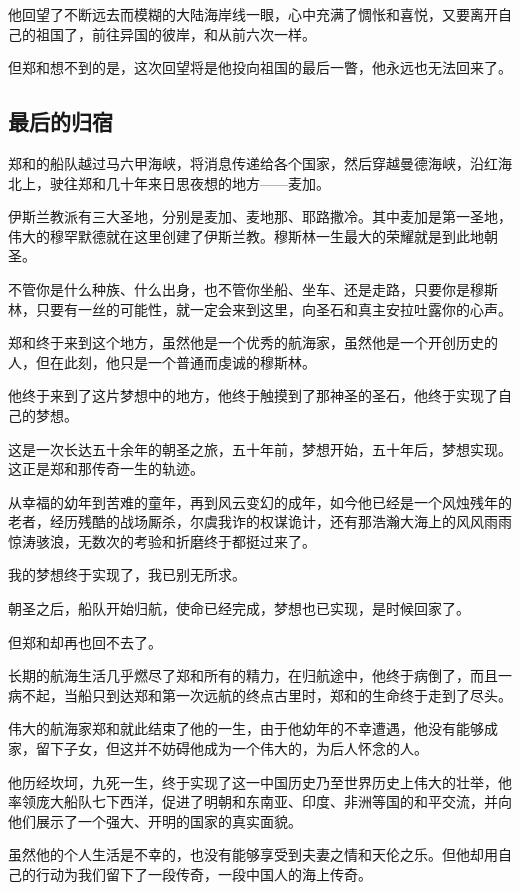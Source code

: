 \begin{multicols}{\theparacolNo}
他回望了不断远去而模糊的大陆海岸线一眼，心中充满了惆怅和喜悦，又要离开自己的祖国了，前往异国的彼岸，和从前六次一样。

但郑和想不到的是，这次回望将是他投向祖国的最后一瞥，他永远也无法回来了。

\subsection{最后的归宿}
郑和的船队越过马六甲海峡，将消息传递给各个国家，然后穿越曼德海峡，沿红海北上，驶往郑和几十年来日思夜想的地方——麦加。

伊斯兰教派有三大圣地，分别是麦加、麦地那、耶路撒冷。其中麦加是第一圣地，伟大的穆罕默德就在这里创建了伊斯兰教。穆斯林一生最大的荣耀就是到此地朝圣。

不管你是什么种族、什么出身，也不管你坐船、坐车、还是走路，只要你是穆斯林，只要有一丝的可能性，就一定会来到这里，向圣石和真主安拉吐露你的心声。

郑和终于来到这个地方，虽然他是一个优秀的航海家，虽然他是一个开创历史的人，但在此刻，他只是一个普通而虔诚的穆斯林。

他终于来到了这片梦想中的地方，他终于触摸到了那神圣的圣石，他终于实现了自己的梦想。

这是一次长达五十余年的朝圣之旅，五十年前，梦想开始，五十年后，梦想实现。这正是郑和那传奇一生的轨迹。

从幸福的幼年到苦难的童年，再到风云变幻的成年，如今他已经是一个风烛残年的老者，经历残酷的战场厮杀，尔虞我诈的权谋诡计，还有那浩瀚大海上的风风雨雨惊涛骇浪，无数次的考验和折磨终于都挺过来了。

我的梦想终于实现了，我已别无所求。

朝圣之后，船队开始归航，使命已经完成，梦想也已实现，是时候回家了。

但郑和却再也回不去了。

长期的航海生活几乎燃尽了郑和所有的精力，在归航途中，他终于病倒了，而且一病不起，当船只到达郑和第一次远航的终点古里时，郑和的生命终于走到了尽头。

伟大的航海家郑和就此结束了他的一生，由于他幼年的不幸遭遇，他没有能够成家，留下子女，但这并不妨碍他成为一个伟大的，为后人怀念的人。

他历经坎坷，九死一生，终于实现了这一中国历史乃至世界历史上伟大的壮举，他率领庞大船队七下西洋，促进了明朝和东南亚、印度、非洲等国的和平交流，并向他们展示了一个强大、开明的国家的真实面貌。

虽然他的个人生活是不幸的，也没有能够享受到夫妻之情和天伦之乐。但他却用自己的行动为我们留下了一段传奇，一段中国人的海上传奇。


\end{multicols}
